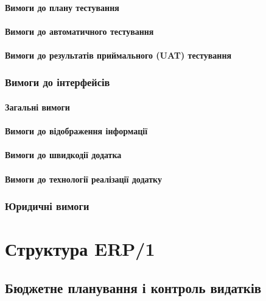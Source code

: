 \subsubsection{Вимоги до плану тестування}

\subsubsection{Вимоги до автоматичного тестування}

\subsubsection{Вимоги до результатів приймального (UAT) тестування}

\subsection{Вимоги до інтерфейсів}

\subsubsection{Загальні вимоги}

\subsubsection{Вимоги до відображення інформації}

\subsubsection{Вимоги до швидкодії додатка}

\subsubsection{Вимоги до технології реалізації додатку}

\subsection{Юридичні вимоги}

\newpage
\chapter{Структура ERP/1}

\section{Бюджетне планування і контроль видатків}


